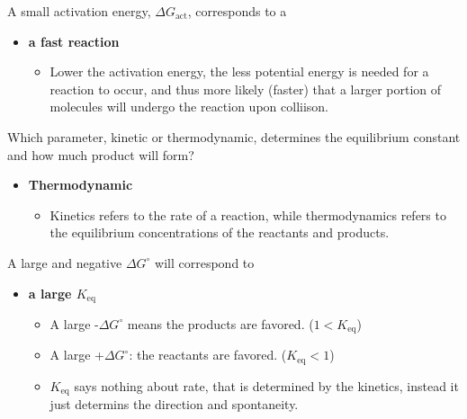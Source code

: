 \documentclass[12pt,a4paper]{article}
\begin{document}
\begin{enumerate}
\begin{itemize}
\begin{itemize}
            \end{itemize}
        \end{itemize}
    {\color{G-Moon}\item A small activation energy, \(\Delta G_{\text{act}}\), corresponds to a}
        \begin{itemize}
            \item {\color{o-Sun}\textbf{a fast reaction}} 
            \begin{itemize}
                \item Lower the activation energy, the less potential energy is needed for a reaction to occur, and thus more likely (faster) that a larger portion of molecules will undergo the reaction upon colliison. 
            \end{itemize}
        \end{itemize}
    {\color{G-Moon}\item Which parameter, kinetic or thermodynamic, determines the equilibrium constant and how much product will form?}
        \begin{itemize}
            \item {\color{o-Sun}\textbf{Thermodynamic}} 
            \begin{itemize}
                \item Kinetics refers to the rate of a reaction, while thermodynamics refers to the equilibrium concentrations of the reactants and products. 
            \end{itemize}
        \end{itemize}
    {\color{G-Moon}\item A large and negative \(\Delta G^\circ\) will correspond to}
        \begin{itemize}
            \item {\color{o-Sun}\textbf{a large \(K_{\text{eq}}\)}} 
            \begin{itemize}
                \item A large {\color{neg}-\(\Delta G^\circ\)} means the {\color{neg}products} are favored. (\(1 < K_{\text{eq}}\))
                \item A large {\color{pos}+\(\Delta G^\circ\)}: the {\color{pos}reactants} are favored. (\(K_{\text{eq}} < 1\))
                \item \(K_{\text{eq}}\) says nothing about rate, that is determined by the kinetics, instead it just determins the direction and spontaneity.
            \end{itemize}
        \end{itemize}
\end{enumerate}
\end{document}
